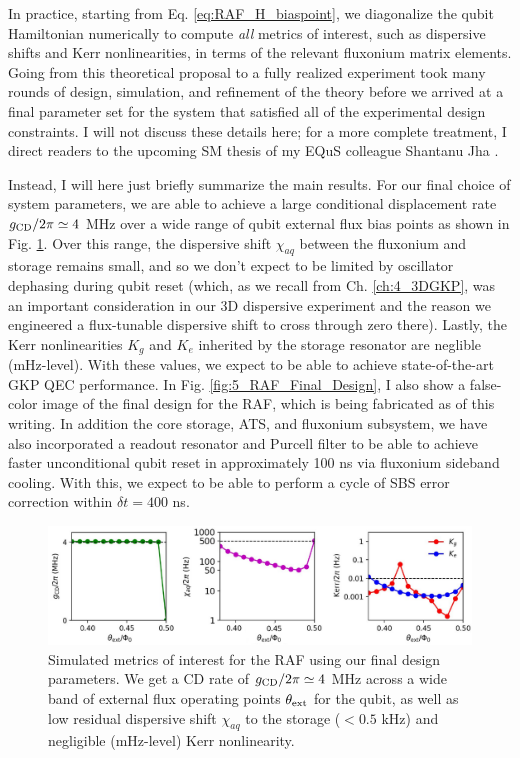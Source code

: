 In practice, starting from Eq. \eqref{eq:RAF_H_biaspoint}, we diagonalize the qubit Hamiltonian numerically to compute \textit{all} metrics of interest, such as dispersive shifts and Kerr nonlinearities, in terms of the relevant fluxonium matrix elements. Going from this theoretical proposal to a fully realized experiment took many rounds of design, simulation, and refinement of the theory before we arrived at a final parameter set for the system that satisfied all of the experimental design constraints. I will not discuss these details here; for a more complete treatment, I direct readers to the upcoming SM thesis of my EQuS colleague Shantanu Jha \cite{shantanu2024thesis}.

Instead, I will here just briefly summarize the main results. For our final choice of system parameters, we are able to achieve a large conditional displacement rate $g_{\rm CD}/2\pi \simeq 4$ MHz over a wide range of qubit external flux bias points as shown in Fig. \ref{fig:5_RAF_Metrics}. Over this range, the dispersive shift $\chi_{aq}$ between the fluxonium and storage remains small, and so we don't expect to be limited by oscillator dephasing during qubit reset (which, as we recall from Ch. \ref{ch:4_3DGKP}, was an important consideration in our 3D dispersive experiment and the reason we engineered a flux-tunable dispersive shift to cross through zero there). Lastly, the Kerr nonlinearities $K_g$ and $K_e$ inherited by the storage resonator are neglible (mHz-level). With these values, we expect to be able to achieve state-of-the-art GKP QEC performance. In Fig. \ref{fig:5_RAF_Final_Design}, I also show a false-color image of the final design for the RAF, which is being fabricated as of this writing. In addition the core storage, ATS, and fluxonium subsystem, we have also incorporated a readout resonator and Purcell filter to be able to achieve faster unconditional qubit reset in approximately 100 ns via fluxonium sideband cooling. With this, we expect to be able to perform a cycle of SBS error correction within $\delta t = 400$ ns. 

\begin{figure}[h]
    \centering
    \includegraphics[width=0.95\linewidth]{Figures/5/RAF_Metrics.pdf}
    \caption{Simulated metrics of interest for the RAF using our final design parameters. We get a CD rate of $g_{\rm CD}/2\pi \simeq 4$ MHz across a wide band of external flux operating points $\theta_{\rm ext}$ for the qubit, as well as low residual dispersive shift $\chi_{aq}$ to the storage ($< 0.5$ kHz) and negligible (mHz-level) Kerr nonlinearity.}
    \label{fig:5_RAF_Metrics}
\end{figure}

